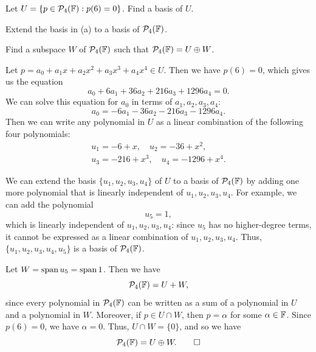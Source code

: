 \begin{exc}
\begin{exercise}\leavevmode
\begin{parts}
\item Let $U=\{p\in\mathcal{P}_4(\mathbb{F}) : p(6)=0\}$. Find a basis of $U$.
\item Extend the basis in (a) to a basis of $\mathcal{P}_4(\mathbb{F})$.
\item Find a subspace $W$ of $\mathcal{P}_4(\mathbb{F})$ such that $\mathcal{P}_4(\mathbb{F})=U\oplus W$.
\end{parts}
\end{exercise}
\begin{solution}
\begin{parts}
\item Let $p=a_0+a_1x+a_2x^2+a_3x^3+a_4x^4\in U$. Then we have $p(6)=0$, which
  gives us the equation
  \[ a_0+6a_1+36a_2+216a_3+1296a_4 = 0. \]
  We can solve this equation for $a_0$ in terms of $a_1,a_2,a_3,a_4$:
  \[ a_0 = -6a_1-36a_2-216a_3-1296a_4. \]
  Then we can write any polynomial in $U$ as a linear combination of the
  following four polynomials:
  \begin{gather*}
  u_1=-6+x, \quad u_2=-36+x^2,\\
  u_3=-216+x^3, \quad u_4=-1296+x^4.
  \end{gather*}
\item We can extend the basis $\{u_1,u_2,u_3,u_4\}$ of $U$ to a basis of
  $\mathcal{P}_4(\mathbb{F})$ by adding one more polynomial that is linearly independent of
  $u_1,u_2,u_3,u_4$. For example, we can add the polynomial
  \[ u_5 = 1, \]
  which is linearly independent of $u_1,u_2,u_3,u_4$: since $u_5$ has no
  higher-degree terms, it cannot be expressed as a linear combination of
  $u_1,u_2,u_3,u_4$. Thus, $\{u_1,u_2,u_3,u_4,u_5\}$ is a basis of
  $\mathcal{P}_4(\mathbb{F})$.
\item Let $W=\operatorname{span} u_5=\operatorname{span} 1$. Then we have
  \[ \mathcal{P}_4(\mathbb{F}) = U+W, \]
  since every polynomial in $\mathcal{P}_4(\mathbb{F})$ can be written as a sum of a
  polynomial in $U$ and a polynomial in $W$. Moreover, if $p\in U\cap W$, then
  $p=\alpha$ for some $\alpha\in\mathbb{F}$. Since $p(6)=0$, we have $\alpha=0$. Thus,
  $U\cap W=\{0\}$, and so we have
  \[ \mathcal{P}_4(\mathbb{F}) = U\oplus W. \qedhere \]
\end{parts}
\end{solution}


\end{exc}
